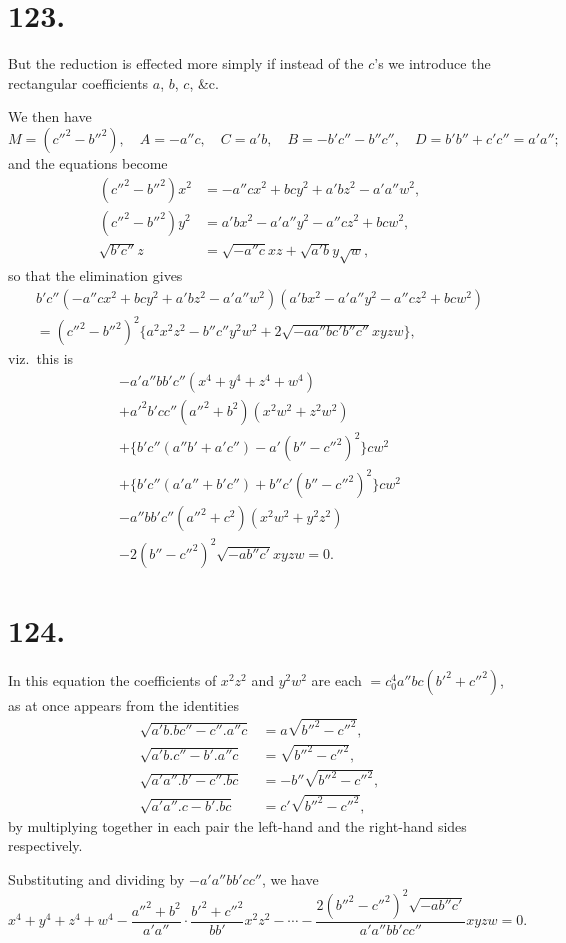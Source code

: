 \documentclass[11pt,a4paper]{article}
\begin{document}
\newpage
\section*{123.}
\label{sec:123}

But the reduction is effected more simply if instead of the $c$'s we introduce the rectangular coefficients $a$, $b$, $c$, \&c.

We then have
\[
M = (c''^2 - b''^2), \quad A = -a''c, \quad C = a'b, \quad B = -b'c'' - b''c'', \quad D = b'b'' + c'c'' = a'a'';
\]
and the equations become
\begin{align*}
(c''^2 - b''^2)x^2 &= -a''cx^2 + bcy^2 + a'bz^2 - a'a''w^2, \\
(c''^2 - b''^2)y^2 &= a'bx^2 - a'a''y^2 - a''cz^2 + bcw^2, \\
\sqrt{b'c''}z &= \sqrt{-a''c}xz + \sqrt{a'b}y\sqrt{w},
\end{align*}
so that the elimination gives
\begin{multline*}
b'c''(-a''cx^2 + bcy^2 + a'bz^2 - a'a''w^2)(a'bx^2 - a'a''y^2 - a''cz^2 + bcw^2) \\
= (c''^2 - b''^2)^2\{a^2x^2z^2 - b''c''y^2w^2 + 2\sqrt{-aa''bc'b''c''}xyzw\},
\end{multline*}
viz.\ this is
\begin{multline*}
-a'a''bb'c''(x^4 + y^4 + z^4 + w^4) \\
+ a'^2b'cc''(a''^2 + b^2)(x^2w^2 + z^2w^2) \\
+ \{b'c''(a''b' + a'c'') - a'(b'' - c''^2)^2\}cw^2 \\
+ \{b'c''(a'a'' + b'c'') + b''c'(b'' - c''^2)^2\}cw^2 \\
- a''bb'c''(a''^2 + c^2)(x^2w^2 + y^2z^2) \\
- 2(b'' - c''^2)^2\sqrt{-ab''c'}xyzw = 0.
\end{multline*}

\newpage
\section*{124.}
\label{sec:124}

In this equation the coefficients of $x^2z^2$ and $y^2w^2$ are each $= c_0^4a''bc(b'^2 + c''^2)$, as at once appears from the identities
\begin{align*}
\sqrt{a'b.bc'' - c''.a''c} &= a\sqrt{b''^2 - c''^2}, \\
\sqrt{a'b.c'' - b'.a''c} &= \sqrt{b''^2 - c''^2}, \\
\sqrt{a'a''.b' - c''.bc} &= -b''\sqrt{b''^2 - c''^2}, \\
\sqrt{a'a''.c - b'.bc} &= c'\sqrt{b''^2 - c''^2},
\end{align*}
by multiplying together in each pair the left-hand and the right-hand sides respectively.

Substituting and dividing by $-a'a''bb'cc''$, we have
\[
x^4 + y^4 + z^4 + w^4 - \frac{a''^2 + b^2}{a'a''} \cdot \frac{b'^2 + c''^2}{bb'}x^2z^2 - \cdots - \frac{2(b''^2 - c''^2)^2\sqrt{-ab''c'}}{a'a''bb'cc''}xyzw = 0.
\]
\end{document}

